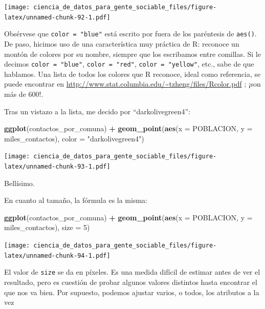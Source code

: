 \documentclass[spanish,]{book}
\newenvironment{Shaded}{\begin{snugshade}}{\end{snugshade}}
\newcommand{\DataTypeTok}[1]{\textcolor[rgb]{0.13,0.29,0.53}{#1}}
\newcommand{\DecValTok}[1]{\textcolor[rgb]{0.00,0.00,0.81}{#1}}
\newcommand{\KeywordTok}[1]{\textcolor[rgb]{0.13,0.29,0.53}{\textbf{#1}}}
\newcommand{\NormalTok}[1]{#1}
\newcommand{\OperatorTok}[1]{\textcolor[rgb]{0.81,0.36,0.00}{\textbf{#1}}}
\newcommand{\StringTok}[1]{\textcolor[rgb]{0.31,0.60,0.02}{#1}}
\begin{document}
\texttt{[image: ciencia\_de\_datos\_para\_gente\_sociable\_files/figure-latex/unnamed-chunk-92-1.pdf]}

Obsérvese que \texttt{color\ =\ "blue"} está escrito por fuera de los paréntesis de \texttt{aes()}. De paso, hicimos uso de una característica muy práctica de R: reconoce un montón de colores por su nombre, siempre que los escribamos entre comillas. Si le decimos \texttt{color\ =\ "blue"}, \texttt{color\ =\ "red"}, \texttt{color\ =\ "yellow"}, etc., sabe de que hablamos. Una lista de todos los colores que R reconoce, ideal como referencia, se puede encontrar en \url{http://www.stat.columbia.edu/~tzheng/files/Rcolor.pdf} ; ¡son más de 600!.

Tras un vistazo a la lista, me decido por ``darkolivegreen4'':

\begin{Shaded}
\begin{Highlighting}[]
\KeywordTok{ggplot}\NormalTok{(contactos_por_comuna) }\OperatorTok{+}\StringTok{ }
\StringTok{    }\KeywordTok{geom_point}\NormalTok{(}\KeywordTok{aes}\NormalTok{(}\DataTypeTok{x =}\NormalTok{ POBLACION, }\DataTypeTok{y =}\NormalTok{ miles_contactos), }\DataTypeTok{color =} \StringTok{"darkolivegreen4"}\NormalTok{)}
\end{Highlighting}
\end{Shaded}

\texttt{[image: ciencia\_de\_datos\_para\_gente\_sociable\_files/figure-latex/unnamed-chunk-93-1.pdf]}

Bellísimo.

En cuanto al tamaño, la fórmula es la misma:

\begin{Shaded}
\begin{Highlighting}[]
\KeywordTok{ggplot}\NormalTok{(contactos_por_comuna) }\OperatorTok{+}\StringTok{ }
\StringTok{    }\KeywordTok{geom_point}\NormalTok{(}\KeywordTok{aes}\NormalTok{(}\DataTypeTok{x =}\NormalTok{ POBLACION, }\DataTypeTok{y =}\NormalTok{ miles_contactos), }\DataTypeTok{size =} \DecValTok{5}\NormalTok{)}
\end{Highlighting}
\end{Shaded}

\texttt{[image: ciencia\_de\_datos\_para\_gente\_sociable\_files/figure-latex/unnamed-chunk-94-1.pdf]}

El valor de \texttt{size} se da en píxeles. Es una medida difícil de estimar antes de ver el resultado, pero es cuestión de probar algunos valores distintos hasta encontrar el que nos va bien. Por supuesto, podemos ajustar varios, o todos, los atributos a la vez
\end{document}
